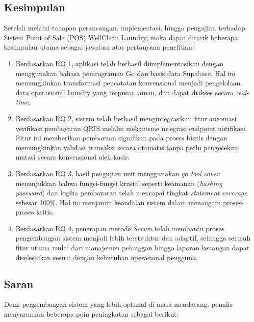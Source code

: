 
\vspace{1cm}
\subsection{Kesimpulan}
\indent
Setelah melalui tahapan perancangan, implementasi, hingga pengujian terhadap Sistem Point of Sale (POS) WellClean Laundry, maka dapat ditarik beberapa kesimpulan utama sebagai jawaban atas pertanyaan penelitian:

\begin{enumerate}
    \item Berdasarkan RQ 1, aplikasi telah berhasil diimplementasikan dengan menggunakan bahasa pemrograman Go dan basis data Supabase. Hal ini memungkinkan transformasi pencatatan konvensional menjadi pengelolaan data operasional laundry yang terpusat, aman, dan dapat diakses secara \textit{real-time}.
    \item Berdasarkan RQ 2, sistem telah berhasil mengintegrasikan fitur automasi verifikasi pembayaran QRIS melalui mekanisme integrasi endpoint notifikasi. Fitur ini memberikan pembaruan signifikan pada proses bisnis dengan memungkinkan validasi transaksi secara otomatis tanpa perlu pengecekan mutasi secara konvensional oleh kasir.
    \item Berdasarkan RQ 3, hasil pengujian unit menggunakan \textit{go tool cover} menunjukkan bahwa fungsi-fungsi krusial seperti keamanan (\textit{hashing password}) dan logika pembayaran telah mencapai tingkat \textit{statement coverage} sebesar 100\%. Hal ini menjamin keandalan sistem dalam menangani proses-proses kritis.
    \item {Berdasarkan RQ 4}, penerapan metode \textit{Scrum} telah membantu proses pengembangan sistem menjadi lebih terstruktur dan adaptif, sehingga seluruh fitur utama mulai dari manajemen pelanggan hingga laporan keuangan dapat diselesaikan sesuai dengan kebutuhan operasional pengguna.
\end{enumerate} 

\vspace{0.5cm}
\subsection{Saran}
\indent
Demi pengembangan sistem yang lebih optimal di masa mendatang, penulis menyarankan beberapa poin peningkatan sebagai berikut:


